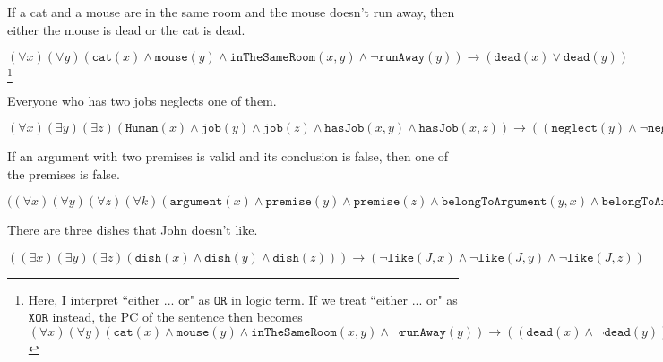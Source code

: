 \begin{QandA}
   \item If a cat and a mouse are in the same room and the mouse doesn’t run away, then either the mouse is dead or the cat is dead.
         \begin{answered}
         $(\forall x)(\forall y)(\texttt{cat}(x) \land \texttt{mouse}(y) \land \texttt{inTheSameRoom}(x,y) \land \neg \texttt{runAway}(y)) 
         \rightarrow (\texttt{dead}(x) \lor \texttt{dead}(y))$ \footnote{Here, I interpret ``either ... or" as $\texttt{OR}$ in logic term. If
         we treat ``either ... or" as $\texttt{XOR}$ instead, the PC of the sentence then becomes
         $(\forall x)(\forall y)(\texttt{cat}(x) \land \texttt{mouse}(y) \land \texttt{inTheSameRoom}(x,y) \land \neg \texttt{runAway}(y)) 
         \rightarrow ((\texttt{dead}(x) \land \neg \texttt{dead}(y)) \lor (\texttt{dead}(y) \land \neg \texttt{dead}(x)))$} 
         \end{answered}
   \item Everyone who has two jobs neglects one of them.
         \begin{answered}
         $(\forall x)(\exists y)(\exists z)(\texttt{Human}(x) \land \texttt{job}(y) \land \texttt{job}(z) \land \texttt{hasJob}(x,y) \land
         \texttt{hasJob}(x,z)) \rightarrow ((\texttt{neglect}(y) \land \neg \texttt{neglect}(z)) \lor (\texttt{neglect}(z) \land 
         \neg \texttt{neglect}(y)))$
         \end{answered}
   \item If an argument with two premises is valid and its conclusion is false, then one of the premises is false.
         \begin{answered}
         $((\forall x)(\forall y)(\forall z)(\forall k)(\texttt{argument}(x) \land \texttt{premise}(y) \land \texttt{premise}(z)
         \land \texttt{belongToArgument}(y,x) \land \texttt{belongToArgument}(z,x) \land \texttt{valid}(x) \land \neg \texttt{conclusion}(k)
         \land \texttt{belongToArgument}(k,x)) \rightarrow (\neg y \lor \neg z)$
         \end{answered}
   \item There are three dishes that John doesn’t like.
         \begin{answered}
         $((\exists x)(\exists y)(\exists z)(\texttt{dish}(x) \land \texttt{dish}(y) \land \texttt{dish}(z))) \rightarrow (
         \neg \texttt{like}(J,x) \land \neg \texttt{like}(J,y) \land \neg \texttt{like}(J,z))$
         \end{answered}
\end{QandA}
